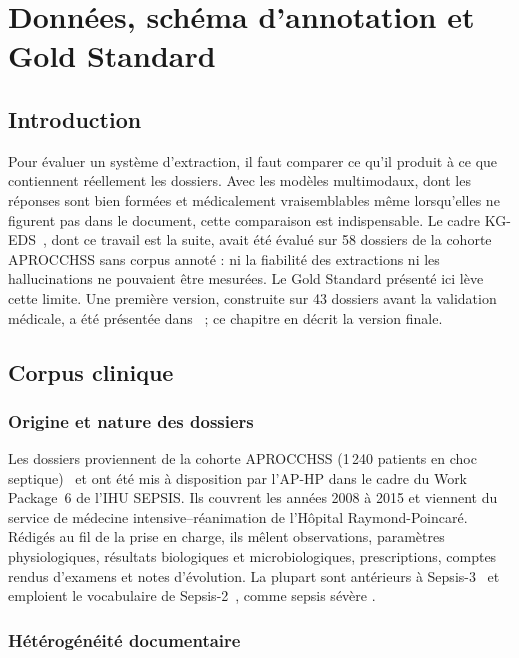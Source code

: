\chapter{Données, schéma d’annotation et Gold Standard}
\label{chap:donnees-gold}

\section{Introduction}\label{sec:c3-3-1}

Pour évaluer un système d’extraction, il faut comparer ce qu’il produit à ce que contiennent réellement les dossiers. Avec les modèles multimodaux, dont les réponses sont bien formées et médicalement vraisemblables même lorsqu’elles ne figurent pas dans le document, cette comparaison est indispensable. Le cadre KG-EDS~\cite{kgeds}, dont ce travail est la suite, avait été évalué sur 58 dossiers de la cohorte APROCCHSS sans corpus annoté : ni la fiabilité des extractions ni les hallucinations ne pouvaient être mesurées. Le Gold Standard présenté ici lève cette limite. Une première version, construite sur 43 dossiers avant la validation médicale, a été présentée dans~\cite{dridi2026jdse} ; ce chapitre en décrit la version finale.

\section{Corpus clinique}\label{sec:c3-3-2}

\subsection{Origine et nature des dossiers}\label{sec:c3-3-2-1}

Les dossiers proviennent de la cohorte APROCCHSS (1\,240 patients en choc septique)~\cite{annane2018aprocchss} et ont été mis à disposition par l’AP-HP dans le cadre du Work Package~6 de l’IHU SEPSIS. Ils couvrent les années 2008 à 2015 et viennent du service de médecine intensive--réanimation de l’Hôpital Raymond-Poincaré. Rédigés au fil de la prise en charge, ils mêlent observations, paramètres physiologiques, résultats biologiques et microbiologiques, prescriptions, comptes rendus d’examens et notes d’évolution. La plupart sont antérieurs à Sepsis-3~\cite{singer2016third} et emploient le vocabulaire de Sepsis-2~\cite{levy2003sccm}, comme \og sepsis sévère \fg{}.

\subsection{Hétérogénéité documentaire}\label{sec:c3-3-2-2}

